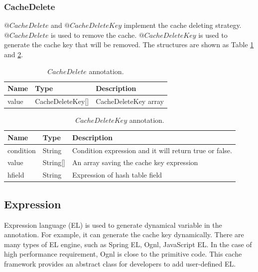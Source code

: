 \documentclass{singlecol-new}
\theoremstyle{TH}{
\newtheorem{lemma}{Lemma}
\newtheorem{theorem}[lemma]{Theorem}
\newtheorem{corrolary}[lemma]{Corrolary}
\newtheorem{conjecture}[lemma]{Conjecture}
\newtheorem{proposition}[lemma]{Proposition}
\newtheorem{claim}[lemma]{Claim}
\newtheorem{stheorem}[lemma]{Wrong Theorem}
}
\theoremstyle{THrm}{
\newtheorem{definition}{Definition}[section]
\newtheorem{question}{Question}[section]
\newtheorem{remark}{Remark}
\newtheorem{scheme}{Scheme}
}
\theoremstyle{THhit}{
\newtheorem{case}{Case}[section]
}
\begin{document}
\subsubsection{CacheDelete}
$@CacheDelete$ and $@CacheDeleteKey$ implement the cache deleting strategy. $@CacheDelete$ is used to remove the cache. $@CacheDeleteKey$ is used to generate the cache key that will be removed. The structures are shown as Table \ref{CacheDelete} and \ref{CacheDeleteKey}.

\begin{table}[htb]
\begin{center}
 \caption{\label{CacheDelete}$CacheDelete$ annotation.}
 \begin{tabular}{lll}
 \toprule
Name & Type & Description\\
 \midrule
value & CacheDeleteKey[] & CacheDeleteKey array\\
\bottomrule
 \end{tabular}
\end{center}
\end{table}

\begin{table}[htb]
\begin{center}
 \caption{\label{CacheDeleteKey}$CacheDeleteKey$ annotation.}
 \begin{tabular}{lll}
 \toprule
Name & Type & Description\\
 \midrule
condition & String & Condition expression and it will return true or false.\\ %
value & String[] & An array saving the cache key expression\\
hfield & String & Expression of hash table field\\
\bottomrule
 \end{tabular}
\end{center}
\end{table}

\subsection{Expression}
Expression language (EL) is used to generate dynamical variable in the annotation. For example, it can generate the cache key dynamically. There are many types of EL engine, such as Spring EL, Ognl, JavaScript EL. In the case of high performance requirement, Ognl is close to the primitive code. This cache framework provides an abstract class for developers to add user-defined EL.
\end{document}
